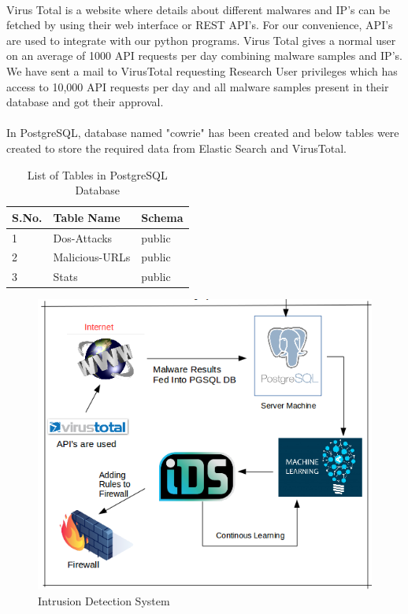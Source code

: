 \documentclass{report}
\begin{document}
\paragraph{}
Virus Total is a website where details about different malwares and IP's can be fetched by using their web interface or REST API's. For our convenience, API's are used to integrate with our python programs. Virus Total gives a normal user on an average of 1000 API requests per day combining malware samples and IP's. We have sent a mail to VirusTotal requesting Research User  privileges which has access to 10,000 API requests per day and all malware samples present in their database and got their approval.

\paragraph{}
In PostgreSQL, database named "cowrie" has been created and below tables were created to store the required data from Elastic Search and VirusTotal.

\begin{table}


\begin{tabular}{ |p{2cm}|p{5cm}|p{5cm}|  }
 \hline
 \textbf{S.No.} & \textbf{Table Name} & \textbf{Schema}\\
 \hline
 \hline
 1 & Dos-Attacks & public \\
 \hline
2 & Malicious-URLs & public \\
\hline
3 & Stats & public \\
\hline
\end{tabular}
 \caption{List of Tables in PostgreSQL Database}
\end{table}




\begin{figure}[H]
\centering
\caption{Intrusion Detection System}
\includegraphics[scale=0.7]{Intrusion_Detection_System}
\end{figure}
\end{document}
